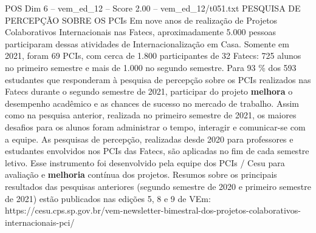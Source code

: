 \begin{textsample}{POS Dim 6 – vem\_ed\_12 – Score 2.00 – vem\_ed\_12/t051.txt}  \label{ex:f6_pos_017}
PESQUISA DE PERCEPÇÃO SOBRE OS PCIs Em nove anos de realização de Projetos Colaborativos Internacionais nas Fatecs, aproximadamente 5.000 pessoas participaram dessas atividades de Internacionalização em Casa.
Somente em 2021, foram 69 PCIs, com cerca de 1.800 participantes de 32 Fatecs: 725 alunos no primeiro semestre e mais de 1.000 no segundo semestre.
Para 93 \% dos 593 estudantes que responderam à pesquisa de percepção sobre os PCIs realizados nas Fatecs durante o segundo semestre de 2021, participar do projeto \textbf{melhora} o desempenho acadêmico e as chances de sucesso no mercado de trabalho.
Assim como na pesquisa anterior, realizada no primeiro semestre de 2021, os maiores desafios para os alunos foram administrar o tempo, interagir e comunicar-se com a equipe.
As pesquisas de percepção, realizadas desde 2020 para professores e estudantes envolvidos nos PCIs das Fatecs, são aplicadas no fim de cada semestre letivo.
Esse instrumento foi desenvolvido pela equipe dos PCIs / Cesu para avaliação e \textbf{melhoria} contínua dos projetos.
Resumos sobre os principais resultados das pesquisas anteriores (segundo semestre de 2020 e primeiro semestre de 2021) estão publicados nas edições 5, 8 e 9 de VEm: https://cesu.cps.sp.gov.br/vem-newsletter-bimestral-dos-projetos-colaborativos-internacionais-pci/

\end{textsample}

